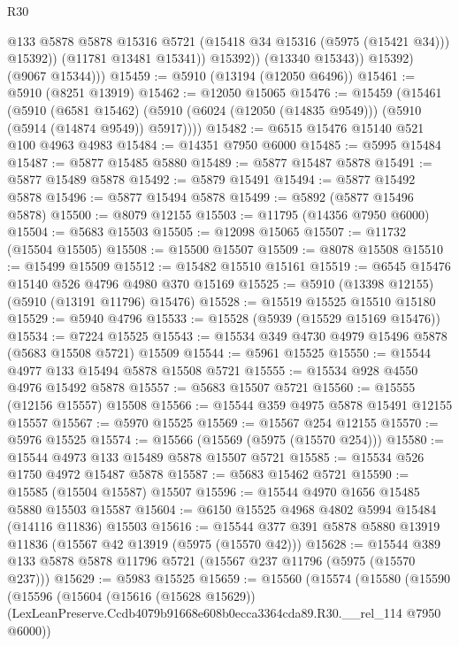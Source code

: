 \begin{lexlean}{R30}
\begin{coremodule}
                      @133
                      @5878
                      @5878
                      @15316
                      @5721
                      (@15418 @34 @15316 (@5975 (@15421 @34)))
                      @15392))
                  (@11781 @13481 @15341))
                @15392))
            (@13340 @15343))
          @15392)
        (@9067 @15344)))
@15459 := @5910 (@13194 (@12050 @6496))
@15461 := @5910 (@8251 @13919)
@15462 := @12050 @15065
@15476 := @15459
    (@15461
      (@5910
        (@6581 @15462)
        (@5910 (@6024 (@12050 (@14835 @9549))) (@5910 (@5914 (@14874 @9549)) @5917))))
@15482 := @6515 @15476 @15140 @521 @100 @4963 @4983
@15484 := @14351 @7950 @6000
@15485 := @5995 @15484
@15487 := @5877 @15485 @5880
@15489 := @5877 @15487 @5878
@15491 := @5877 @15489 @5878
@15492 := @5879 @15491
@15494 := @5877 @15492 @5878
@15496 := @5877 @15494 @5878
@15499 := @5892 (@5877 @15496 @5878)
@15500 := @8079 @12155
@15503 := @11795 (@14356 @7950 @6000)
@15504 := @5683 @15503
@15505 := @12098 @15065
@15507 := @11732 (@15504 @15505)
@15508 := @15500 @15507
@15509 := @8078 @15508
@15510 := @15499 @15509
@15512 := @15482 @15510 @15161
@15519 := @6545 @15476 @15140 @526 @4796 @4980 @370 @15169
@15525 := @5910 (@13398 @12155) (@5910 (@13191 @11796) @15476)
@15528 := @15519 @15525 @15510 @15180
@15529 := @5940 @4796
@15533 := @15528 (@5939 (@15529 @15169 @15476))
@15534 := @7224 @15525
@15543 := @15534 @349 @4730 @4979 @15496 @5878 (@5683 @15508 @5721) @15509
@15544 := @5961 @15525
@15550 := @15544 @4977 @133 @15494 @5878 @15508 @5721
@15555 := @15534 @928 @4550 @4976 @15492 @5878
@15557 := @5683 @15507 @5721
@15560 := @15555 (@12156 @15557) @15508
@15566 := @15544 @359 @4975 @5878 @15491 @12155 @15557
@15567 := @5970 @15525
@15569 := @15567 @254 @12155
@15570 := @5976 @15525
@15574 := @15566 (@15569 (@5975 (@15570 @254)))
@15580 := @15544 @4973 @133 @15489 @5878 @15507 @5721
@15585 := @15534 @526 @1750 @4972 @15487 @5878
@15587 := @5683 @15462 @5721
@15590 := @15585 (@15504 @15587) @15507
@15596 := @15544 @4970 @1656 @15485 @5880 @15503 @15587
@15604 := @6150 @15525 @4968 @4802 @5994 @15484 (@14116 @11836) @15503
@15616 := @15544 @377 @391 @5878 @5880 @13919 @11836 (@15567 @42 @13919 (@5975 (@15570 @42)))
@15628 := @15544 @389 @133 @5878 @5878 @11796 @5721 (@15567 @237 @11796 (@5975 (@15570 @237)))
@15629 := @5983 @15525
@15659 := @15560
    (@15574
      (@15580
        (@15590
          (@15596
            (@15604
              (@15616 (@15628 @15629))
              (LexLeanPreserve.Ccdb4079b91668e608b0ecca3364cda89.R30.__rel_114 @7950 @6000))

\end{coremodule}
\end{lexlean}
